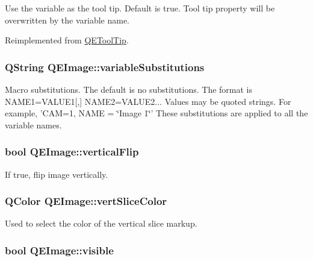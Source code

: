 \label{classQEImage_a6e3d7da4bcac6579ac582fe5c18ed405}
Use the variable as the tool tip. Default is true. Tool tip property will be overwritten by the variable name. 

Reimplemented from \hyperlink{classQEToolTip}{QEToolTip}.

\hypertarget{classQEImage_aee84acf36f836245b576d9d4066f70fa}{
\subsubsection[{variableSubstitutions}]{\setlength{\rightskip}{0pt plus 5cm}QString QEImage::variableSubstitutions}}
\label{classQEImage_aee84acf36f836245b576d9d4066f70fa}
Macro substitutions. The default is no substitutions. The format is NAME1=VALUE1\mbox{[},\mbox{]} NAME2=VALUE2... Values may be quoted strings. For example, 'CAM=1, NAME = \char`\"{}Image 1\char`\"{}' These substitutions are applied to all the variable names. \hypertarget{classQEImage_a0b4219b866cd2e75d70e1b58da369bae}{
\subsubsection[{verticalFlip}]{\setlength{\rightskip}{0pt plus 5cm}bool QEImage::verticalFlip}}
\label{classQEImage_a0b4219b866cd2e75d70e1b58da369bae}
If true, flip image vertically. \hypertarget{classQEImage_ab5da21cd9976c568c4570ef51e055c4e}{
\subsubsection[{vertSliceColor}]{\setlength{\rightskip}{0pt plus 5cm}QColor QEImage::vertSliceColor}}
\label{classQEImage_ab5da21cd9976c568c4570ef51e055c4e}
Used to select the color of the vertical slice markup. \hypertarget{classQEImage_a759388af5e06a2a86e300e1a5b6ce532}{
\subsubsection[{visible}]{\setlength{\rightskip}{0pt plus 5cm}bool QEImage::visible}}
